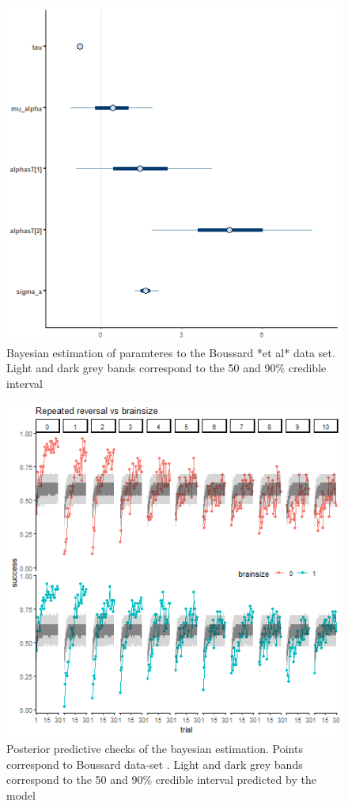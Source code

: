 \documentclass[
]{article}
\begin{document}
\begin{figure}

\includegraphics{boussard_mcmc_interv} \hfill{}

\caption{Bayesian estimation of paramteres to the Boussard *et al* data set. Light and dark grey bands correspond to the 50 and 90\% credible interval}\label{fig:boussard_interv}
\end{figure}

\begin{figure}

\includegraphics{boussard_ppchecks} \hfill{}

\caption{Posterior predictive checks of the bayesian estimation. Points correspond to Boussard data-set . Light and dark grey bands correspond to the 50 and 90\% credible interval predicted by the model}\label{fig:ppchecks_boussard}
\end{figure}
\end{document}
